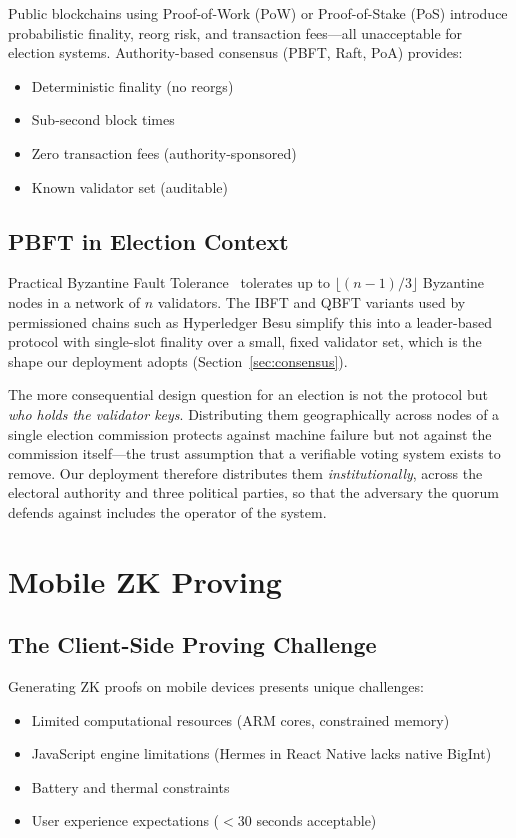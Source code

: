 Public blockchains using Proof-of-Work (PoW) or Proof-of-Stake (PoS) introduce probabilistic finality, reorg risk, and transaction fees---all unacceptable for election systems. Authority-based consensus (PBFT, Raft, PoA) provides:
\begin{itemize}
    \item Deterministic finality (no reorgs)
    \item Sub-second block times
    \item Zero transaction fees (authority-sponsored)
    \item Known validator set (auditable)
\end{itemize}

\subsection{PBFT in Election Context}

Practical Byzantine Fault Tolerance~\cite{castro1999practical} tolerates up to $\lfloor(n-1)/3\rfloor$ Byzantine nodes in a network of $n$ validators. The IBFT and QBFT variants used by permissioned chains such as Hyperledger Besu simplify this into a leader-based protocol with single-slot finality over a small, fixed validator set, which is the shape our deployment adopts (Section~\ref{sec:consensus}).

The more consequential design question for an election is not the protocol but \emph{who holds the validator keys}. Distributing them geographically across nodes of a single election commission protects against machine failure but not against the commission itself---the trust assumption that a verifiable voting system exists to remove. Our deployment therefore distributes them \emph{institutionally}, across the electoral authority and three political parties, so that the adversary the quorum defends against includes the operator of the system.

\section{Mobile ZK Proving}

\subsection{The Client-Side Proving Challenge}

Generating ZK proofs on mobile devices presents unique challenges:
\begin{itemize}
    \item Limited computational resources (ARM cores, constrained memory)
    \item JavaScript engine limitations (Hermes in React Native lacks native BigInt)
    \item Battery and thermal constraints
    \item User experience expectations ($<$30 seconds acceptable)
\end{itemize}

